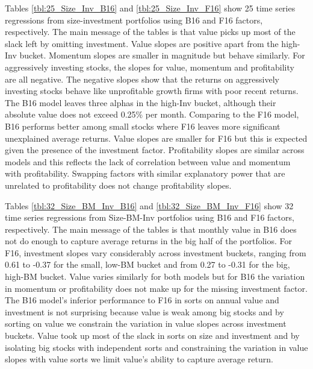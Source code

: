 
Tables \ref{tbl:25_Size_Inv_B16} and \ref{tbl:25_Size_Inv_F16} show 25 time series
regressions from size-investment portfolios using B16 and F16 factors, respectively. The
main message of the tables is that value picks up most of the slack left by omitting
investment. Value slopes are positive apart from the high-Inv bucket. Momentum slopes are
smaller in magnitude but behave similarly. For aggressively investing stocks, the slopes
for value, momentum and profitability are all negative. The negative slopes show that the
returns on aggressively investing stocks behave like unprofitable growth firms with poor
recent returns. The B16 model leaves three alphas in the high-Inv bucket, although their
absolute value does not exceed 0.25\% per month. Comparing to the F16 model, B16 performs
better among small stocks where F16 leaves more significant unexplained average returns.
Value slopes are smaller for F16 but this is expected given the presence of the investment
factor. Profitability slopes are similar across models and this reflects the lack of
correlation between value and momentum with profitability. Swapping factors with similar
explanatory power that are unrelated to profitability does not change profitability
slopes.

Tables \ref{tbl:32_Size_BM_Inv_B16} and \ref{tbl:32_Size_BM_Inv_F16} show 32 time series
regressions from Size-BM-Inv portfolios using B16 and F16 factors, respectively. The main
message of the tables is that monthly value in B16 does not do enough to capture average
returns in the big half of the portfolios. For F16, investment slopes vary considerably
across investment buckets, ranging from 0.61 to -0.37 for the small, low-BM bucket and
from 0.27 to -0.31 for the big, high-BM bucket. Value varies similarly for both models but
for B16 the variation in momentum or profitability does not make up for the missing
investment factor. The B16 model's inferior performance to F16 in sorts on annual value
and investment is not surprising because value is weak among big stocks and by sorting on
value we constrain the variation in value slopes across investment buckets. Value took up
most of the slack in sorts on size and investment and by isolating big stocks with
independent sorts and constraining the variation in value slopes with value sorts we limit
value's ability to capture average return.
